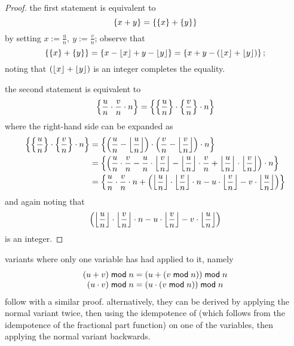 \documentclass[a4paper, 12pt]{report}
\begin{document}
\begin{proof}
	the first statement is equivalent to
	\begin{equation*}
		\left\{ x + y \right\} = \left\{ \left\{ x \right\} + \left\{ y \right\} \right\}
	\end{equation*}
	by setting $x := \frac{u}{n}, \ y := \frac{v}{n}$; observe that
	\begin{equation*}
		  \left\{ \left\{ x \right\} + \left\{ y \right\} \right\}
		= \left\{ x - \left\lfloor x \right\rfloor + y - \left\lfloor y \right\rfloor \right\}
		= \left\{ x + y - (\left\lfloor x \right\rfloor + \left\lfloor y \right\rfloor) \right\};
	\end{equation*}
	noting that $(\left\lfloor x \right\rfloor + \left\lfloor y \right\rfloor)$ is an integer completes the equality. \bigskip

	the second statement is equivalent to
	\begin{equation*}
		  \left\{ \frac{u}{n} \cdot \frac{v}{n} \cdot n \right\}
		= \left\{ \left\{ \frac{u}{n} \right\} \cdot \left\{ \frac{v}{n} \right\} \cdot n \right\}
	\end{equation*}
	where the right-hand side can be expanded as
	\begin{align*}
		    \left\{ \left\{ \frac{u}{n} \right\} \cdot \left\{ \frac{v}{n} \right\} \cdot n \right\}
		& = \left\{ 
			\left(\frac{u}{n} - \left\lfloor \frac{u}{n} \right\rfloor\right) \cdot
			\left(\frac{v}{n} - \left\lfloor \frac{v}{n} \right\rfloor\right) \cdot n
		 \right\} \\
		& = \left\{ 
			\left(
			         \frac{u}{n}  \cdot        \frac{v}{n}
			-        \frac{u}{n}  \cdot \left\lfloor \frac{v}{n} \right\rfloor
			- \left\lfloor \frac{u}{n} \right\rfloor \cdot        \frac{v}{n}
			+ \left\lfloor \frac{u}{n} \right\rfloor \cdot \left\lfloor \frac{v}{n} \right\rfloor
			\right) \cdot n
		 \right\} \\
		& = \left\{ 
			\frac{u}{n} \cdot \frac{v}{n} \cdot n +
			\left(
			      \left\lfloor \frac{u}{n} \right\rfloor \cdot \left\lfloor \frac{v}{n} \right\rfloor \cdot n
			    - u \cdot \left\lfloor \frac{v}{n} \right\rfloor
			    - v \cdot \left\lfloor \frac{u}{n} \right\rfloor
			\right)
		 \right\}
	\end{align*}
	and again noting that
	\begin{equation*}
		\left(
			\left\lfloor \frac{u}{n} \right\rfloor \cdot \left\lfloor \frac{v}{n} \right\rfloor \cdot n
			- u \cdot \left\lfloor \frac{v}{n} \right\rfloor
			- v \cdot \left\lfloor \frac{u}{n} \right\rfloor
		\right)
	\end{equation*}
	is an integer.
\end{proof}

\begin{corollary}
	variants where only one variable has had \tmod{} applied to it, namely
	\begin{equation*}
		\begin{array}{c}
			(u + v) \;\mathsf{mod}\; n = (u + (v \;\mathsf{mod}\; n)) \;\mathsf{mod}\; n \\
			(u \cdot v) \;\mathsf{mod}\; n = (u \cdot (v \;\mathsf{mod}\; n)) \;\mathsf{mod}\; n
		\end{array}
	\end{equation*}
	follow with a similar proof. alternatively, they can be derived by applying the normal variant twice, then using the idempotence of \tmod{} (which follows from the idempotence of the fractional part function) on one of the variables, then applying the normal variant backwards.
\end{corollary}
\end{document}
